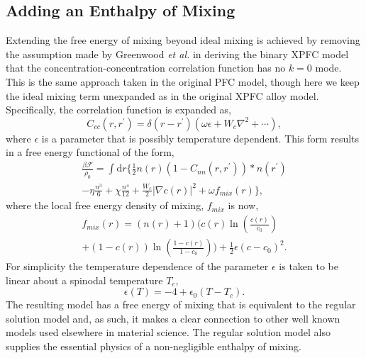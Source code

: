 \documentclass[showkeys, prb, reprint]{revtex4-1}
\renewcommand{\d}{\delta}       %
\newcommand{\F}{\mathcal{F}}    %
\renewcommand{\l}{\left}        %
\renewcommand{\r}{\right}       %
\newcommand{\f}{\frac}          %
\newcommand{\integrate}[1]{\int\!\mathrm{d}#1}
\begin{document}
\subsection{Adding an Enthalpy of Mixing} %

Extending the free energy of mixing beyond ideal mixing is achieved by removing
the assumption made by Greenwood \textit{et al.} in deriving the binary XPFC
model that the concentration-concentration correlation function has no $k=0$
mode. This is the same approach taken in the original PFC model, though here we
keep the ideal mixing term unexpanded as in the original XPFC alloy model.
Specifically, the correlation function is expanded as,
%
\begin{equation}
    C_{cc}(r, r^\prime) = \d(r - r^\prime)
        \l(\omega\epsilon + W_c\nabla^2 + \cdots\r),
\end{equation}
%
where $\epsilon$ is a parameter that is possibly temperature dependent. This
form results in a free energy functional of the form,
%
\begin{multline}
    \f{\beta\F}{\rho_0} = \integrate{r} \Bigg\{ 
        \f{1}{2} n(r) \l(1 - C_{nn}(r, r^\prime)\r) \ast n(r^\prime)
        \\- \eta \f{n^3}{6} + \chi \f{n^4}{12}
        + \f{W_c}{2}\l\vert \nabla c(r) \r\vert^2 + \omega f_{mix}(r)
            \Bigg\}, 
\end{multline}
%
where the local free energy density of mixing, $f_{mix}$ is now,
%
\begin{multline}
    f_{mix}(r) = \l(n(r) + 1\r)\Bigg(
            c(r)\ln\l(\f{c(r)}{c_0}\r)
          \\+ (1-c(r))\ln\l(\f{1-c(r)}{1-c_0}\r) \Bigg)
          + \f{1}{2} \epsilon (c - c_0)^2.
\end{multline}
%
For simplicity the temperature dependence of the parameter $\epsilon$ is taken
to be linear about a spinodal temperature $T_c$,
%
\begin{equation}
    \label{eq:spinodal_model}
    \epsilon(T) = -4 + \epsilon_0(T - T_c).
\end{equation}
%
The resulting model has a free energy of mixing that is equivalent to the
regular solution model and, as such, it makes a clear connection to other well known models used elsewhere in material science. The regular solution model also supplies
the essential physics of a non-negligible enthalpy of mixing. 

\end{document}
